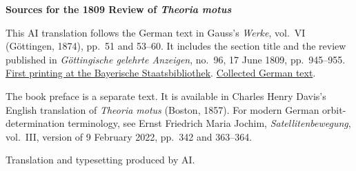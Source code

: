 \clearpage\thispagestyle{empty}
\begin{center}\textbf{Sources for the 1809 Review of \textit{Theoria motus}}\end{center}
\noindent This AI translation follows the German text in Gauss’s \textit{Werke}, vol.~VI (Göttingen, 1874), pp.~51 and 53--60. It includes the section title and the review published in \textit{Göttingische gelehrte Anzeigen}, no.~96, 17 June 1809, pp.~945--955. \href{https://www.digitale-sammlungen.de/de/view/bsb10538675?page=947}{First printing at the Bayerische Staatsbibliothek}. \href{https://gdz.sub.uni-goettingen.de/id/PPN236007467}{Collected German text}.
\par\smallskip\noindent The book preface is a separate text. It is available in Charles Henry Davis’s English translation of \textit{Theoria motus} (Boston, 1857). For modern German orbit-determination terminology, see Ernst Friedrich Maria Jochim, \textit{Satellitenbewegung}, vol.~III, version of 9 February 2022, pp.~342 and 363--364.
\par\smallskip\noindent Translation and typesetting produced by AI.
\clearpage
